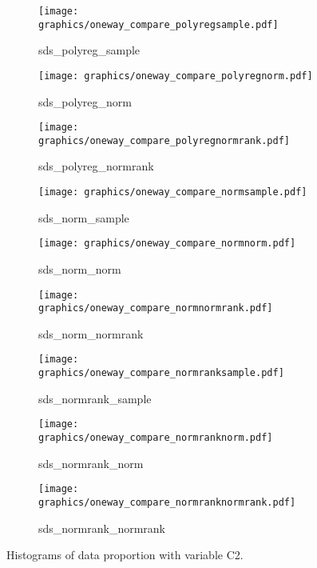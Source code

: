 \newpage
\begin{figure}[H]\ContinuedFloat
    \begin{subfigure}{0.32\textwidth}
        \centering
        \texttt{[image: graphics/oneway\_compare\_polyregsample.pdf]}  
        \caption{sds\_polyreg\_sample}
        \label{subfig:polyregsamplec2}
    \end{subfigure}
    \begin{subfigure}{0.32\textwidth}
        \centering
        \texttt{[image: graphics/oneway\_compare\_polyregnorm.pdf]}  
        \caption{sds\_polyreg\_norm}
        \label{subfig:polyregnormc2}
    \end{subfigure}
    \begin{subfigure}{0.32\textwidth}
        \centering
        \texttt{[image: graphics/oneway\_compare\_polyregnormrank.pdf]}  
        \caption{sds\_polyreg\_normrank}
        \label{subfig:polyregnormrankc2}
    \end{subfigure}
    \medskip
    \begin{subfigure}{0.32\textwidth}
        \centering
        \texttt{[image: graphics/oneway\_compare\_normsample.pdf]}  
        \caption{sds\_norm\_sample}
        \label{subfig:normsamplec2}
    \end{subfigure}
    \begin{subfigure}{0.32\textwidth}
        \centering
        \texttt{[image: graphics/oneway\_compare\_normnorm.pdf]}  
        \caption{sds\_norm\_norm}
        \label{subfig:normnormc2}
    \end{subfigure}
    \begin{subfigure}{0.32\textwidth}
        \centering
        \texttt{[image: graphics/oneway\_compare\_normnormrank.pdf]}  
        \caption{sds\_norm\_normrank}
        \label{subfig:normnormrankc2}
    \end{subfigure}
    \medskip
    \begin{subfigure}{0.32\textwidth}
        \centering
        \texttt{[image: graphics/oneway\_compare\_normranksample.pdf]}  
        \caption{sds\_normrank\_sample}
        \label{subfig:normranksamplec2}
    \end{subfigure}
    \begin{subfigure}{0.32\textwidth}
        \centering
        \texttt{[image: graphics/oneway\_compare\_normranknorm.pdf]}  
        \caption{sds\_normrank\_norm}
        \label{subfig:normranknormc2}
    \end{subfigure}
    \begin{subfigure}{0.32\textwidth}
        \centering
        \texttt{[image: graphics/oneway\_compare\_normranknormrank.pdf]}  
        \caption{sds\_normrank\_normrank}
        \label{subfig:normranknormrankc2}
    \end{subfigure}
    \caption[]{Histograms of data proportion with variable C2.}
    \label{fig:c2-2}
\end{figure}

